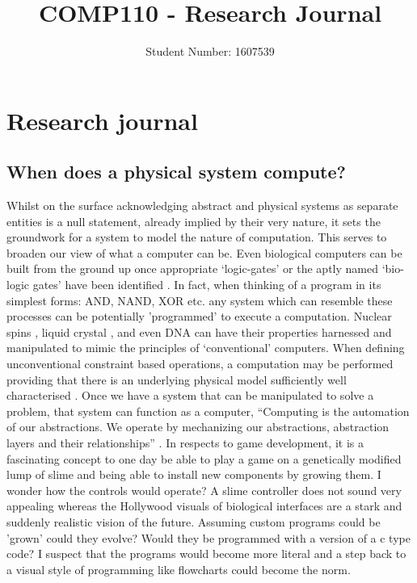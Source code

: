 \documentclass{scrartcl}
\title{COMP110 - Research Journal}
\author{Student Number: 1607539}
\begin{document}
\maketitle


\section*{Research journal}

\subsection*{When does a physical system compute? \cite{horsman2014does}}

Whilst on the surface acknowledging abstract and physical systems as separate entities is a null statement, already implied by their very nature, it sets the groundwork for a system to model the nature of computation. This serves to broaden our view of what a computer can be. Even biological computers can be built from the ground up once appropriate `logic-gates' or the aptly named `bio-logic gates' have been identified \cite{fisher2007executable}. In fact, when thinking of a program in its simplest forms: AND, NAND, XOR etc. any system which can resemble these processes can be potentially 'programmed' to execute a computation. Nuclear spins \cite{bechmann2011boolean}, liquid crystal \cite{harding2004evolution}, and even DNA \cite{jonoska2006theoretica} can have their properties harnessed and manipulated to mimic the principles of `conventional' computers. When defining unconventional constraint based operations, a computation may be performed providing that there is an underlying physical model sufficiently well characterised \cite{stepney2014local}. Once we have a system that can be manipulated to solve a problem, that system can function as a computer, ``Computing is the automation of our abstractions. We operate by mechanizing our abstractions, abstraction layers and their relationships'' \cite{wing2008computational}. In respects to game development, it is a fascinating concept to one day be able to play a game on a genetically modified lump of slime and being able to install new components by growing them. I wonder how the controls would operate? A slime controller does not sound very appealing whereas the Hollywood visuals of biological interfaces are a stark and suddenly realistic vision of the future. Assuming custom programs could be 'grown' could they evolve? Would they be programmed with a version of a c type code? I suspect that the programs would become more literal and a step back to a visual style of programming like flowcharts could become the norm.
\end{document}
